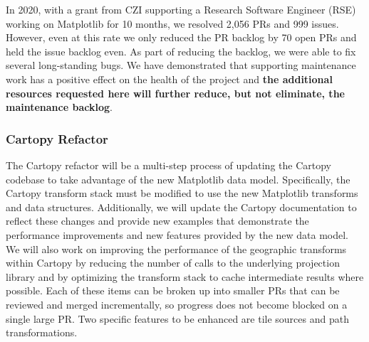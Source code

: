 \documentclass[12pt]{article}
\numberwithin{page}{section}
\begin{document}

In 2020, with a grant from CZI supporting a Research Software Engineer
(RSE) working on Matplotlib for 10 months, we resolved 2,056 PRs and
999 issues.  However, even at this rate we only reduced the PR backlog
by 70 open PRs and held the issue backlog even.  As part of reducing
the backlog, we were able to fix several long-standing bugs.  We have
demonstrated that supporting maintenance work has a positive effect on
the health of the project and \textbf{the additional resources
  requested here will further reduce, but not eliminate, the
  maintenance backlog}.



\subsubsection{Cartopy Refactor}

The Cartopy refactor will be a multi-step process of updating the
Cartopy codebase to take advantage of the new Matplotlib data model.
Specifically, the Cartopy transform stack must be modified to use the new Matplotlib transforms
and data structures. Additionally, we will update the Cartopy documentation to
reflect these changes and provide new examples that demonstrate the performance
improvements and new features provided by the new data model. We will
also work on improving the performance of the geographic transforms within Cartopy
by reducing the number of calls to the underlying projection library and by optimizing
the transform stack to cache intermediate results where possible. Each of these items
can be broken up into smaller PRs that can be reviewed and merged
incrementally, so progress does not become blocked on a single
large PR. Two specific features to be enhanced are tile sources and path transformations.
\end{document}

